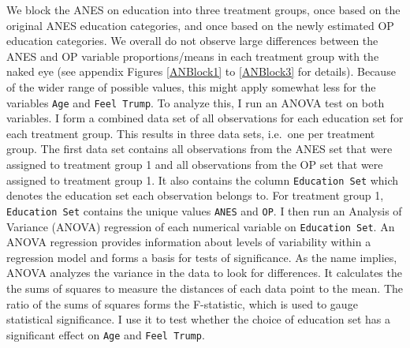\documentclass[12pt,econ]{sources/authesis}
\begin{document}
We block the ANES on education into three treatment groups, once based on the original ANES education categories, and once based on the newly estimated OP education categories. We overall do not observe large differences between the ANES and OP variable proportions/means in each treatment group with the naked eye (see appendix Figures \ref{ANBlock1} to \ref{ANBlock3} for details). Because of the wider range of possible values, this might apply somewhat less for the variables \texttt{Age} and \texttt{Feel\ Trump}. To analyze this, I run an ANOVA test on both variables. I form a combined data set of all observations for each education set for each treatment group. This results in three data sets, i.e.~one per treatment group. The first data set contains all observations from the ANES set that were assigned to treatment group 1 and all observations from the OP set that were assigned to treatment group 1. It also contains the column \texttt{Education\ Set} which denotes the education set each observation belongs to. For treatment group 1, \texttt{Education\ Set} contains the unique values \texttt{ANES} and \texttt{OP}. I then run an Analysis of Variance (ANOVA) regression of each numerical variable on \texttt{Education\ Set}. An ANOVA regression provides information about levels of variability within a regression model and forms a basis for tests of significance. As the name implies, ANOVA analyzes the variance in the data to look for differences. It calculates the the sums of squares to measure the distances of each data point to the mean. The ratio of the sums of squares forms the F-statistic, which is used to gauge statistical significance. I use it to test whether the choice of education set has a significant effect on \texttt{Age} and \texttt{Feel\ Trump}.
\end{document}
